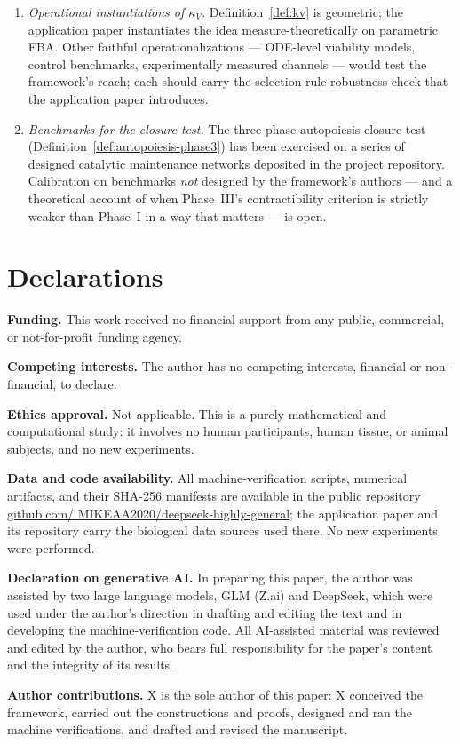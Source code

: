 \documentclass[11pt,a4paper]{article}
\theoremstyle{plain}
\theoremstyle{definition}
\theoremstyle{remark}
\newcommand{\kk}{\kappa_{\!V}}
\begin{document}
\begin{enumerate}[leftmargin=*,itemsep=3pt]
empirical rates analytically is open.
\item \emph{Operational instantiations of $\kk$.}
Definition~\ref{def:kv} is geometric; the application paper
\citep{zai2026measure} instantiates the idea measure-theoretically
on parametric FBA. Other faithful operationalizations --- ODE-level
viability models, control benchmarks, experimentally measured
channels --- would test the framework's reach; each should carry the selection-rule robustness check that the application paper introduces.
\item \emph{Benchmarks for the closure test.} The three-phase
autopoiesis closure test (Definition~\ref{def:autopoiesis-phase3})
has been exercised on a series of designed catalytic maintenance
networks deposited in the project repository. Calibration on
benchmarks \emph{not} designed by the framework's authors --- and a
theoretical account of when Phase~III's contractibility criterion is
strictly weaker than Phase~I in a way that matters --- is open.
\end{enumerate}

\section*{Declarations}
\noindent\textbf{Funding.} This work received no financial support
from any public, commercial, or not-for-profit funding agency.

\smallskip
\noindent\textbf{Competing interests.} The author has no
competing interests, financial or non-financial, to declare.

\smallskip
\noindent\textbf{Ethics approval.} Not applicable. This is a purely
mathematical and computational study: it involves no human
participants, human tissue, or animal subjects, and no new
experiments.

\smallskip
\noindent\textbf{Data and code availability.} All
machine-verification scripts, numerical artifacts, and their SHA-256
manifests are available in the public repository
\href{https://github.com/MIKEAA2020/deepseek-highly-general}{github.com/
MIKEAA2020/deepseek-highly-general}; the application paper
\citep{zai2026measure} and its repository carry the biological data
sources used there. No new experiments were performed.

\smallskip
\noindent\textbf{Declaration on generative AI.} In preparing this
paper, the author was assisted by two large language models, GLM
(Z.ai) and DeepSeek, which were used under the author's direction in
drafting and editing the text and in developing the
machine-verification code. All AI-assisted material was reviewed and
edited by the author, who bears full responsibility for the paper's
content and the integrity of its results.

\smallskip
\noindent\textbf{Author contributions.} X is the sole author of this
paper: X conceived the framework, carried out the constructions and
proofs, designed and ran the machine verifications, and drafted and
revised the manuscript.



\end{document}
